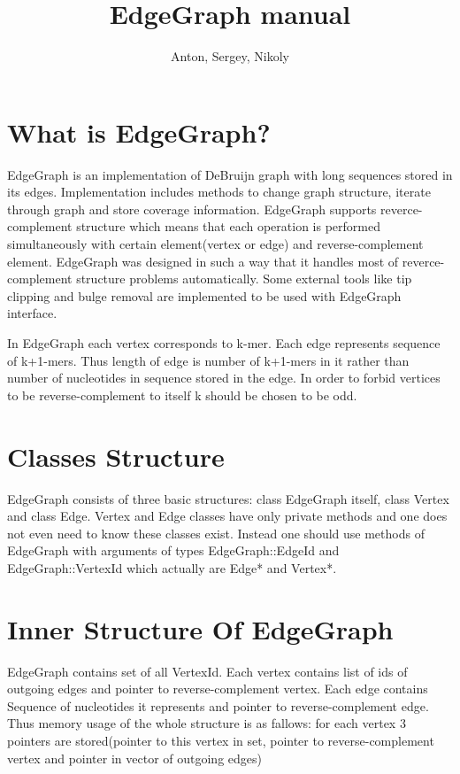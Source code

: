 \documentclass[a4paper,10pt]{article}
\title{EdgeGraph manual}
\author{Anton, Sergey, Nikoly}
\begin{document}
\maketitle

\section*{What is EdgeGraph?}
EdgeGraph is an implementation of DeBruijn graph with long sequences stored in its edges.
Implementation includes methods to change graph structure, iterate through graph and store coverage information.
EdgeGraph supports reverce-complement structure which means that each operation is performed simultaneously with 
certain element(vertex or edge) and reverse-complement element.
EdgeGraph was designed in such a way that it handles most of reverce-complement structure problems automatically.
Some external tools like tip clipping and bulge removal are implemented to be used with EdgeGraph interface.

In EdgeGraph each vertex corresponds to k-mer.
Each edge represents sequence of k+1-mers.
Thus length of edge is number of k+1-mers in it rather than number of nucleotides in sequence stored in the edge.
In order to forbid vertices to be reverse-complement to itself k should be chosen to be odd.

\section*{Classes Structure}
EdgeGraph consists of three basic structures: class EdgeGraph itself, class Vertex and class Edge.
Vertex and Edge classes have only private methods and one does not even need to know these classes exist.
Instead one should use methods of EdgeGraph with arguments of types EdgeGraph::EdgeId and EdgeGraph::VertexId which actually are
Edge* and Vertex*.

\section*{Inner Structure Of EdgeGraph}
EdgeGraph contains set of all VertexId.
Each vertex contains list of ids of outgoing edges and pointer to reverse-complement vertex.
Each edge contains Sequence of nucleotides it represents and pointer to reverse-complement edge.
Thus memory usage of the whole structure is as fallows: for each vertex 3 pointers are stored(pointer to this vertex in set, pointer
to reverse-complement vertex and pointer in vector of outgoing edges)
\end{document}
